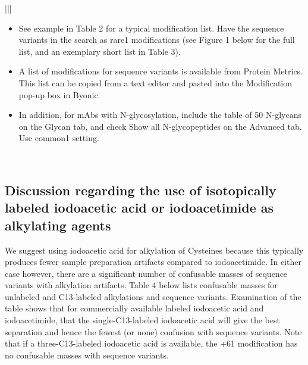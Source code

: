 \documentclass[letterpaper,10pt,oneside,english]{sphinxmanual}
\begin{document}
\begin{savenotes}
\begin{tabular}[t]{|||}
\begin{itemize}
\item {} 
See example in Table 2 for a typical modification list.  Have the sequence variants in the search as rare1 modifications (see Figure 1 below for the full list, and an exemplary short list in Table 3).

\item {} 
A list of modifications for sequence variants is available from Protein Metrics.  This list can be copied from a text editor and pasted into the Modification pop-up box in Byonic.

\item {} 
In addition, for mAbs with N-glycosylation, include the table of 50 N-glycans on the Glycan tab, and check Show all N-glycopeptides on the Advanced tab. Use common1 setting.

\end{itemize}
\\
\hline
\end{tabular}
\par
\sphinxattableend\end{savenotes}


\subsection{Discussion regarding the use of isotopically labeled iodoacetic acid or iodoacetimide as alkylating agents}
\label{\detokenize{applicationnote:discussion-regarding-the-use-of-isotopically-labeled-iodoacetic-acid-or-iodoacetimide-as-alkylating-agents}}\label{\detokenize{applicationnote:id1}}
We suggest using iodoacetic acid for alkylation of Cysteines because this typically produces fewer sample preparation artifacts compared to iodoacetimide.  In either case however, there are a significant number of confusable masses of sequence variants with alkylation artifacts.  Table 4 below lists confusable masses for unlabeled and C13-labeled alkylations and sequence variants.  Examination of the table shows that for commercially available labeled iodoacetic acid and iodoacetimide, that the single-C13-labeled iodoacetic acid will give the best separation and hence the fewest (or none) confusion with sequence variants.  Note that if a three-C13-labeled iodoacetic acid is available, the +61 modification has no confusable masses with sequence variants.

\begin{figure}[H]
\centering

\noindent{}
\end{figure}
\end{document}
